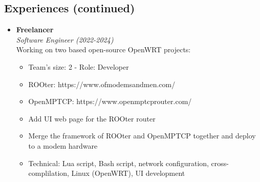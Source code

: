 \documentclass[10pt,oneside,a4paper]{article}
\begin{document}
\begin{tcolorbox}
    \begin{minipage}[t]{8cm}
        \vspace*{-0.5cm}
        \begin{tcolorbox}[grow to left by=0.6cm, colback=gray!25,colframe=white]
            \vspace*{25.5cm}
        \end{tcolorbox}
    \end{minipage}
    \begin{minipage}[t]{11cm}
        \vspace*{-0.5cm}
        \begin{tcolorbox}[grow to right by=0.75cm,colback=white,colframe=white]
            \section*{Experiences \textnormal{(continued)}}
            \begin{itemize}
                \item 
                {
                    \textbf{Freelancer} \\
                    \emph{Software Engineer (2022-2024)} \\
                    Working on two based open-source OpenWRT projects:
                    \begin{itemize}[label=$\circ$]
                        \item {Team's size: 2 - Role: Developer}
                        \item {ROOter: https://www.ofmodemsandmen.com/}
                        \item {OpenMPTCP: https://www.openmptcprouter.com/}
                        \item {Add UI web page for the ROOter router}
                        \item {Merge the framework of ROOter and OpenMPTCP together and deploy to a modem hardware}
                        \item {Technical: Lua script, Bash script, network configuration, cross-complilation, Linux (OpenWRT), UI development}
                    \end{itemize}
                }
            \end{itemize}
        \end{tcolorbox}
    \end{minipage}

\end{tcolorbox}
\end{document}
